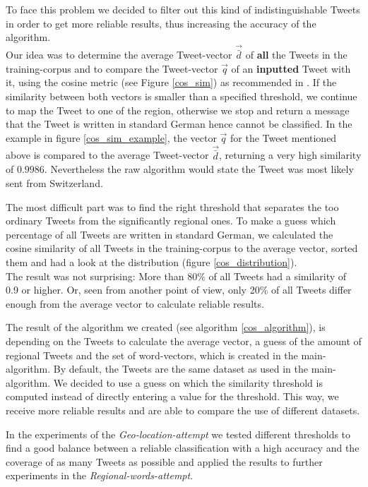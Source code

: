 \documentclass[./Main.tex]{subfiles}
\begin{document}
To face this problem we decided to filter out this kind of indistinguishable Tweets in order to get more reliable results, thus increasing the accuracy of the algorithm. \\
Our idea was to determine the average Tweet-vector $\vec{\bar{d}}$ of \textbf{all} the Tweets in the training-corpus and to compare the Tweet-vector $\vec{q}$ of an \textbf{inputted} Tweet with it, using the cosine metric (see Figure \ref{cos_sim}) as recommended in \cite[805]{SaLP}. If the similarity between both vectors is smaller than a specified threshold, we continue to map the Tweet to one of the region, otherwise we stop and return a message that the Tweet is written in standard German hence cannot be classified. In the example in figure \ref{cos_sim_example}, the vector $\vec{q}$ for the Tweet mentioned above is compared to the average Tweet-vector $\vec{\bar{d}}$, returning a very high similarity of $0.9986$. Nevertheless the raw algorithm would state the Tweet was most likely sent from Switzerland.

The most difficult part was to find the right threshold that separates the too ordinary Tweets from the significantly regional ones. To make a guess which percentage of all Tweets are written in standard German, we calculated the cosine similarity of all Tweets in the training-corpus to the average vector, sorted them and had a look at the distribution (figure \ref{cos_distribution}). \\
The result was not surprising: More than 80\% of all Tweets had a similarity of 0.9 or higher. Or, seen from another point of view, only 20\% of all Tweets differ enough from the average vector to calculate reliable results.

The result of  the algorithm we created (see algorithm \ref{cos_algorithm}), is depending on the Tweets to calculate the average vector, a guess of the amount of regional Tweets and the set of word-vectors,  which is created in the main-algorithm. By default, the Tweets are the same dataset as used in the main-algorithm. We decided to use a guess on which the similarity threshold is computed instead of directly entering a value for the threshold. This way, we receive more reliable results and are able to compare the use of different datasets.

In the experiments of the \emph{Geo-location-attempt} we tested different thresholds to find a good balance between a reliable classification with a high accuracy and the coverage of as many Tweets as possible and applied the results to further experiments in the \emph{Regional-words-attempt}.\\
\end{document}
